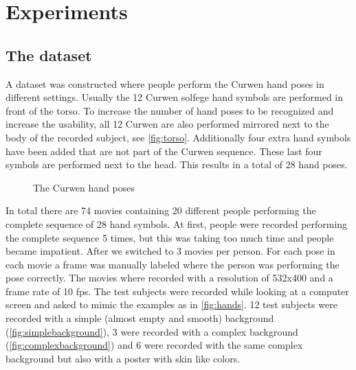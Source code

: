 
\chapter{Experiments}
\label{ch:experiments}


\section{The dataset}
A dataset was constructed where people perform the Curwen hand poses in different settings. Usually the 12 Curwen solfege hand symbols are performed in front of the torso. To increase the number of hand poses to be recognized and increase the usability, all 12 Curwen are also performed mirrored next to the body of the recorded subject, see \autoref{fig:torso}. Additionally four extra hand symbols have been added that are not part of the Curwen sequence. These last four symbols are performed next to the head. This results in a total of 28 hand poses.

\begin{figure}[tb]
  \centering
\hspace{0.03\linewidth}
  \caption{The Curwen hand poses}
  \label{fig:torso}
\end{figure}


In total there are 74 movies containing 20 different people performing the complete sequence of 28 hand symbols. At first, people were recorded performing the complete sequence 5 times, but this was taking too much time and people became impatient. After we switched to 3 movies per person. For each pose in each movie a frame was manually labeled where the person was performing the pose correctly.  The movies where recorded with  a resolution of 532x400 and a frame rate of 10 fps. The test subjects were recorded while looking at a computer screen and asked to mimic the examples as in \autoref{fig:hands}. 12 test subjects were recorded with a simple (almost empty and smooth) background (\autoref{fig:simplebackground}), 3 were recorded with a complex background (\autoref{fig:complexbackground}) and 6 were recorded with the same complex background but also with a poster with skin like colors.

